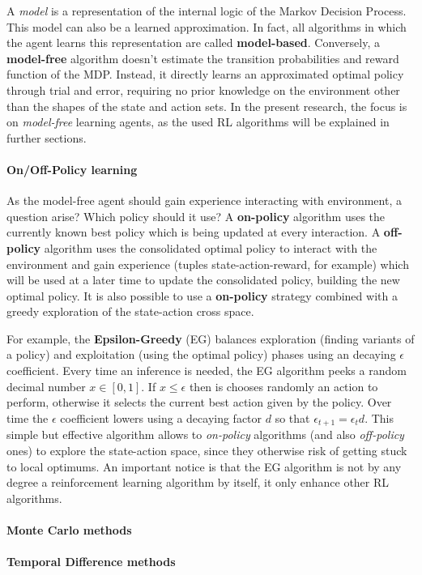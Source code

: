 A \textit{model} is a representation of the internal logic of the Markov Decision Process. This model can also be a learned approximation. In fact, all algorithms in which the agent learns this representation are called \textbf{model-based}. Conversely, a \textbf{model-free} algorithm doesn't estimate the transition probabilities and reward function of the MDP. Instead, it directly learns an approximated optimal policy through trial and error, requiring no prior knowledge on the environment other than the shapes of the state and action sets.
In the present research, the focus is on \textit{model-free} learning agents, as the used RL algorithms will be explained in further sections.

\paragraph{On/Off-Policy learning}

As the model-free agent should gain experience interacting with environment, a question arise? Which policy should it use? A \textbf{on-policy} algorithm uses the currently known best policy which is being updated at every interaction. A \textbf{off-policy} algorithm uses the consolidated optimal policy to interact with the environment and gain experience (tuples state-action-reward, for example) which will be used at a later time to update the consolidated policy, building the new optimal policy. It is also possible to use a \textbf{on-policy} strategy combined with a greedy exploration of the state-action cross space.

For example, the \textbf{Epsilon-Greedy} (EG) balances exploration (finding variants of a policy) and exploitation (using the optimal policy) phases using an decaying $\epsilon$ coefficient.
Every time an inference is needed, the EG algorithm peeks a random decimal number $x \in [0, 1]$. If $x \leq \epsilon$ then is chooses randomly an action to perform, otherwise it selects the current best action given by the policy.
Over time the $\epsilon$ coefficient lowers using a decaying factor $d$ so that $\epsilon_{t + 1} = \epsilon_{t} d$. This simple but effective algorithm allows to \textit{on-policy} algorithms (and also \textit{off-policy} ones) to explore the state-action space, since they otherwise risk of getting stuck to local optimums.
An important notice is that the EG algorithm is not by any degree a reinforcement learning algorithm by itself, it only enhance other RL algorithms.

\paragraph{Monte Carlo methods}

\paragraph{Temporal Difference methods}
